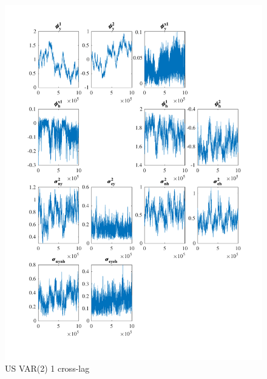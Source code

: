 \documentclass[
  12pt,
]{article}
\begin{document}
\begin{figure}

{\centering \includegraphics[width=0.85\linewidth]{../../Regression/Bayesian_UC_VAR2_nodrift_Crosscycle1lag/OutputData/posteriorchain_US} 

}

\caption{US VAR(2) 1 cross-lag}\label{fig:unnamed-chunk-19}
\end{figure}
\end{document}

